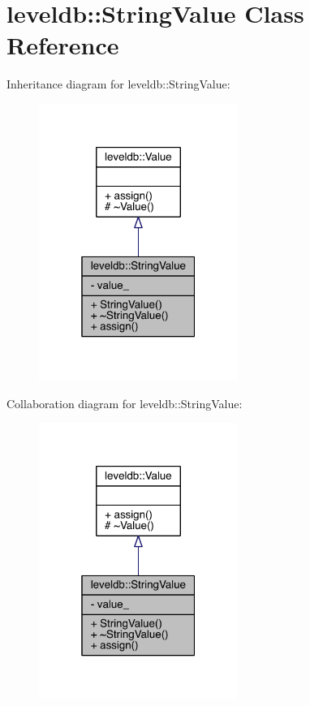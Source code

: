 \hypertarget{classleveldb_1_1_string_value}{}\section{leveldb\+:\+:String\+Value Class Reference}
\label{classleveldb_1_1_string_value}


Inheritance diagram for leveldb\+:\+:String\+Value\+:\nopagebreak
\begin{figure}[H]
\begin{center}
\leavevmode
\includegraphics[width=184pt]{classleveldb_1_1_string_value__inherit__graph}
\end{center}
\end{figure}


Collaboration diagram for leveldb\+:\+:String\+Value\+:\nopagebreak
\begin{figure}[H]
\begin{center}
\leavevmode
\includegraphics[width=184pt]{classleveldb_1_1_string_value__coll__graph}
\end{center}
\end{figure}
